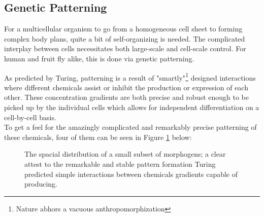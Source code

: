 \subsection{Genetic Patterning}
\label{sec:gen_patterns}
For a multicellular organism to go from a homogeneous cell sheet to forming complex body plans, quite a bit of self-organizing is needed. The complicated interplay between cells necessitates both large-scale and cell-scale control. For human and fruit fly alike, this is done via genetic patterning.\cite{veraksa2000developmental}

As predicted by Turing, patterning is a result of "smartly"\footnote{Nature abhors a vacuous anthropomorphization} designed interactions where different chemicals assist or inhibit the production or expression of each other. These concentration gradients are both precise and robust enough to be picked up by the individual cells which allows for independent differentiation on a cell-by-cell basis.\\


To get a feel for the amazingly complicated and remarkably precise patterning of these chemicals, four of them can be seen in Figure \ref{fig:MorphogenMap} below:


\noindent

\begin{figure}[H]
    \centering
    \caption{The spacial distribution of a small subset of morphogens; a clear attest to the remarkable and stable pattern formation Turing predicted simple interactions between chemicals gradients capable of producing.}
    \label{fig:MorphogenMap}
\end{figure}

